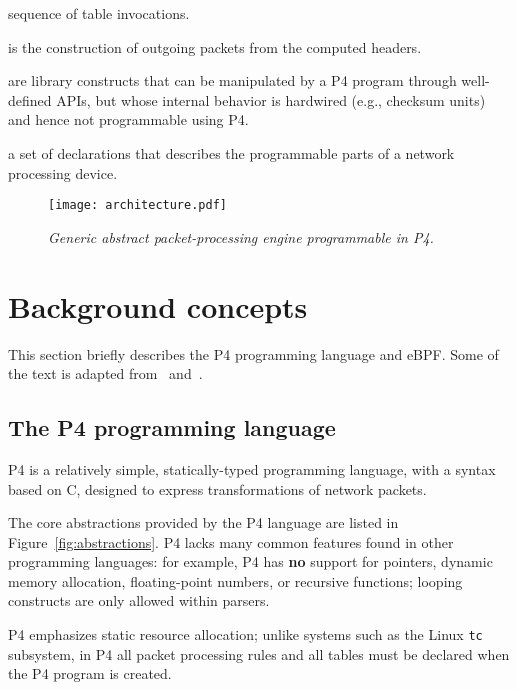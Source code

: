 \begin{figure*}[h]
\begin{mdframed}[style=mdstyle]
\begin{description}
			sequence of table invocations.
			\item[Deparsing] is the construction of outgoing packets from the
			computed headers.
			\item[Extern objects] are library constructs that can be manipulated
			by a P4 program through well-defined APIs, but whose internal
			behavior is hardwired (e.g., checksum units) and hence not
			programmable using P4.
			\item[Architecture definition:] a set of declarations that describes
			the programmable parts of a network processing device.
		\end{description}
	\end{mdframed}
	\caption{\sl Core abstractions of the P4 programming 
	language.\label{fig:abstractions}}
\end{figure*}

\begin{figure}[ht]
	\centerline{\texttt{[image: architecture.pdf]}}
	\caption{\sl Generic abstract packet-processing engine programmable
		in P4.\label{fig:architecture}}
\end{figure}
\section{Background concepts}\label{sec:background}

This section briefly describes the P4 programming language and
eBPF. Some of the text is adapted from~\cite{budiu-osr17}
and~\cite{p4-ebpf-backend}.

\subsection{The P4 programming language}

P4 is a relatively
simple, statically-typed programming language, with a syntax based on
C, designed to express transformations of network packets.

The core abstractions provided by the P4 language are listed in
Figure~\ref{fig:abstractions}.  P4 lacks many common features found in
other programming languages: for example, P4 has \textbf{no} support
for pointers, dynamic memory allocation, floating-point numbers, or
recursive functions; looping constructs are only allowed within
parsers.

P4 emphasizes static resource allocation; unlike systems such as the
Linux \texttt{tc} subsystem, in P4 all packet processing rules and all tables
must be declared when the P4 program is created.


